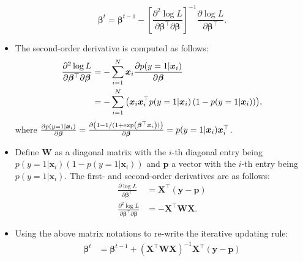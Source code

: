 \begin{itemize}
                    \begin{equation}
                        \bm{\beta}^t = \bm{\beta}^{t-1} - \left[ \frac{\partial^2 \log L}{\partial \bm{\beta}^\top \partial \bm{\beta}} \right]^{-1} \frac{\partial \log L}{\partial \bm{\beta}^\top}.
                    \end{equation}
                \item The second-order derivative is computed as follows:
                    \begin{equation}
                        \begin{aligned}
                            \frac{\partial^2 \log L}{\partial \bm{\beta}^\top \partial \bm{\beta}} & = -\sum_{i=1}^{N}{\bm{x}_i \frac{\partial p(y=1 | \bm{x}_i)}{\partial \bm{\beta}}   }  \\
                            & = -\sum_{i=1}^{N}{\left( \bm{x}_i \bm{x}_i^\top p(y=1 | \bm{x}_i) \left( 1 - p(y=1 | \bm{x}_i)\right) \right)},
                        \end{aligned}
                    \end{equation}
                where $\frac{\partial p(y=1 | \bm{x}_i)}{\partial \bm{\beta}} = \frac{\partial \left( 1 - 1 / (1 +  \text{exp}\left( \bm{\beta}^\top \bm{x}_i \right) )\right)}{\partial \bm{\beta}} = p(y=1 | \bm{x}_i) \bm{x}_i^\top$.
                \item Define $\bm{W}$ as a diagonal matrix with the $i$-th diagonal entry being $p(y=1| \bm{x}_i)(1 - p(y=1 | \bm{x}_i))$ and $\bm{p}$ a vector with the $i$-th entry being $p(y=1|\bm{x}_i)$.
                The first- and second-order derivatives are as follows:
                    \begin{equation}
                        \begin{aligned}
                            \frac{\partial \log L}{\partial \bm{\beta}^\top} & = \bm{X}^\top (\bm{y} - \bm{p}) \\
                            \frac{\partial^2 \log L}{\partial \bm{\beta}^\top \partial \bm{\beta}} & = -\bm{X}^\top \bm{W} \bm{X}.
                        \end{aligned}
                    \end{equation}  
                \item Using the above matrix notations to re-write the iterative updating rule:
                    \begin{equation}
                        \begin{aligned}
                            \bm{\beta}^t & = \bm{\beta}^{t-1} + \left(\bm{X}^\top \bm{W} \bm{X}\right)^{-1} \bm{X}^\top (\bm{y} - \bm{p}) \\

\end{aligned}
\end{equation}
\end{itemize}
